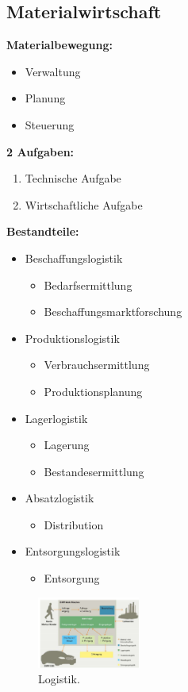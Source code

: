 \documentclass[../ZF_Wing.tex]{subfiles}
\begin{document}
\subsection{Materialwirtschaft}
\colorbox{blue!30}{\textbf{Materialbewegung:}}
\begin{itemize}
	\item Verwaltung
	\item Planung
	\item Steuerung
	
\end{itemize}

\colorbox{blue!30}{\textbf{2 Aufgaben:}}
\begin{enumerate}
	\item Technische Aufgabe
	\item Wirtschaftliche Aufgabe

\end{enumerate}


\colorbox{blue!30}{\textbf{Bestandteile:}}
\begin{itemize}
	\item Beschaffungslogistik
	\begin{itemize}
		\item Bedarfsermittlung
		\item Beschaffungsmarktforschung
	\end{itemize}
	\item Produktionslogistik
	\begin{itemize}
		\item Verbrauchsermittlung
		\item Produktionsplanung
	\end{itemize}
	\item Lagerlogistik
	\begin{itemize}
		\item Lagerung
		\item Bestandesermittlung
	\end{itemize}
	\item Absatzlogistik
	\begin{itemize}
		\item Distribution
	\end{itemize}
	\item Entsorgungslogistik
	\begin{itemize}
		\item Entsorgung
	\end{itemize}
\end{itemize}


\begin{figure}[H]
\centering
\includegraphics[width=0.3\textwidth]{Resources/Image/Logistik.png}
\caption{\label{fig:GliederungER}Logistik.}
\end{figure}
\end{document}
